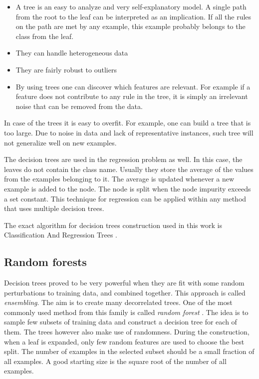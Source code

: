 \documentclass{pracamgr}
\begin{document}
\begin{itemize}
\item{A tree is an easy to analyze and very self-explanatory
model. A single path from the root to the leaf can be interpreted as an implication. If all
the rules on the path are met by any example, this example probably belongs to the class
from the leaf.}
\item{They can handle heterogeneous data}
\item{They are fairly robust to outliers}
\item{By using trees one can discover which features are relevant. 
For example if a feature does not contribute to any rule in the tree, it is simply an
irrelevant noise that can be removed from the data.}
\end{itemize}

In case of the trees it is easy to overfit. For example, one can build a tree that
is too large. Due to noise in data and lack of representative instances, such tree
will not generalize well on new examples.

The decision trees are used in the regression problem as well. In this case, the
leaves do not contain the class name. Usually they store the average of the values from
the examples belonging to it. The average is updated whenever a new example is added to
the node. The node is split when the node impurity exceeds a set constant. This
technique for regression can be applied within any method that uses multiple decision
trees.

The exact algorithm for decision trees construction used in this work is Classification
And Regression Trees \citep{cart84}.

\subsection{Random forests}
Decision trees proved to be very powerful when they are fit
with some random perturbations to training data, and combined together. This
approach is called \textit{ensembling}. The aim is to create many decorrelated trees. One of
the most commonly used method from this family is called \textit{random
forest} \citep{breiman2001random}. The idea is to sample few subsets of training data and
construct a decision tree for each of them. The trees however also make use of randomness. During
the construction, when a leaf is expanded, only few random features are used to choose the
best split. The number of examples in the selected subset should be a small fraction of all
examples. A good starting size is the square root of the number of all examples.
\end{document}
